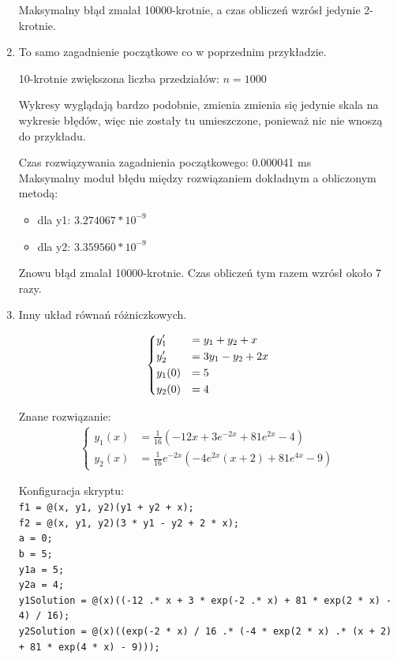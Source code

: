 \documentclass[12pt]{article}
\begin{document}
\begin{enumerate}[label=\textbf{Przykład \arabic*}]
		Maksymalny błąd zmalał 10000-krotnie, a czas obliczeń wzrósł jedynie 2-krotnie.
		
		\item
		\label{example-bigN}
		
		To samo zagadnienie początkowe co w poprzednim przykładzie.
		
		10-krotnie zwiększona liczba przedziałów: $n = 1000$
		
		Wykresy wyglądają bardzo podobnie, zmienia zmienia się jedynie skala na wykresie błędów, więc nie zostały tu umieszczone, ponieważ nic nie wnoszą do przykładu.
		
		Czas rozwiązywania zagadnienia początkowego: 0.000041 ms\\
		Maksymalny moduł błędu między rozwiązaniem dokładnym a obliczonym metodą:
		\begin{itemize}
			\item dla y1: $3.274067 * 10^{-9}$
			\item dla y2: $3.359560 * 10^{-9}$
		\end{itemize}
		
		Znowu błąd zmalał 10000-krotnie. Czas obliczeń tym razem wzrósł około 7 razy.
		
		\item
		Inny układ równań różniczkowych.
		
		\begin{align*}
		\begin{dcases}
			y_1' &= y_1 + y_2 + x \\
			y_2' &= 3y_1 - y_2 + 2x \\
			y_1(0) &= 5 \\
			y_2(0) &= 4
		\end{dcases}
		\end{align*}
		
		Znane rozwiązanie:
		\begin{align*}
		\begin{cases}
			y_1(x) &= \frac{1}{16} (-12x + 3e^{-2x} + 81e^{2x} - 4) \\
			y_2(x) &= \frac{1}{16}e^{-2x}(-4e^{2x}(x + 2) + 81e^{4x} - 9)
		\end{cases}
		\end{align*}
		
		Konfiguracja skryptu: \\
		\texttt{f1 = @(x, y1, y2)(y1 + y2 + x); \\
		f2 = @(x, y1, y2)(3 * y1 - y2 + 2 * x); \\
		a = 0; \\
		b = 5; \\
		y1a = 5; \\
		y2a = 4; \\
		y1Solution = @(x)((-12 .* x + 3 * exp(-2 .* x) + 81 * exp(2 * x) - 4) / 16); \\ 
		y2Solution = @(x)((exp(-2 * x) / 16 .* (-4 * exp(2 * x) .* (x + 2) + 81 * exp(4 * x) - 9)));
		}
	

\end{enumerate}
\end{document}
